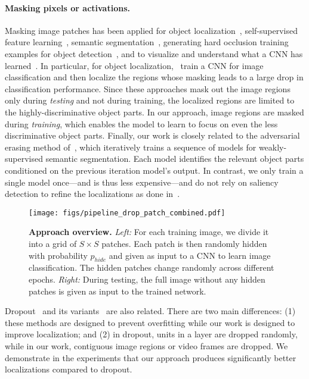 \documentclass[10pt,twocolumn,letterpaper]{article}
\begin{document}
\vspace{-10pt}\paragraph{Masking pixels or activations.}  Masking image patches has been applied for object localization~\cite{bazzani_wacv2016}, self-supervised feature learning~\cite{pathak-cvpr2016}, semantic segmentation~\cite{bharath-eccv2014,dai-cvpr2015}, generating
hard occlusion training examples for object detection~\cite{wang-cvpr2017}, and to visualize and understand what a CNN has learned~\cite{Zeiler-eccv2014}.  In particular, for object localization,~\cite{Zeiler-eccv2014,bazzani_wacv2016} train a CNN for image classification and then localize the regions whose masking leads to a large drop in classification performance. Since these approaches mask out the image regions only during \emph{testing} and not during training, the localized regions are limited to the highly-discriminative object parts. In our approach, image regions are masked during \emph{training}, which enables the model to learn to focus on even the less discriminative object parts. Finally, our work is closely related to the adversarial erasing method of~\cite{wei-cvpr2017}, which iteratively trains a sequence of models for weakly-supervised semantic segmentation.  Each model identifies the relevant object parts conditioned on the previous iteration model's output.  In contrast, we only train a single model once---and is thus less expensive---and do not rely on saliency detection to refine the localizations as done in~\cite{wei-cvpr2017}.

\begin{figure*}[t!]
\centering
    \texttt{[image: figs/pipeline\_drop\_patch\_combined.pdf]}
    \caption{
    \textbf{Approach overview.}
    \textit{Left:} For each training image, we divide it into a grid of $S \times S$ patches.  Each patch is then randomly hidden with probability $p_{hide}$ and given as input to a CNN to learn image classification.  The hidden patches change randomly across different epochs. \textit{Right:} During testing, the full image without any hidden patches is given as input to the trained network.}
\label{fig:pipeline}
\vspace*{-0.1in}
\end{figure*}

Dropout~\cite{srivastava-jmlr2014} and its variants~\cite{wan-icml2013,tompson-cvpr2015} are also related.  There are two main differences: (1) these methods are designed to prevent overfitting while our work is designed to improve localization; and (2) in dropout, units in a layer are dropped randomly, while in our work, contiguous image regions or video frames are dropped.  We demonstrate in the experiments that our approach produces significantly better localizations compared to dropout.
\end{document}
